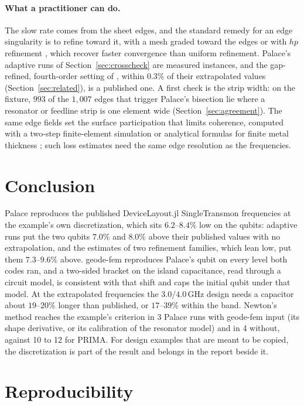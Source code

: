 \documentclass{anvil-paper}
\begin{document}
\paragraph{What a practitioner can do.}
The slow rate comes from the sheet edges, and the standard remedy for an
edge singularity is to refine toward it, with a mesh graded toward the
edges or with $hp$ refinement \citep{demkowicz2006computing}, which recover
faster convergence than uniform refinement. Palace's adaptive runs of
Section~\ref{sec:crosscheck} are measured instances, and the gap-refined,
fourth-order setting of \citet{ye2025electromagnetic}, within $0.3\%$ of
their extrapolated values (Section~\ref{sec:related}), is a published one.
A first check is the strip width: on the fixture, $993$ of the $1{,}007$
edges that trigger Palace's bisection lie where a resonator or feedline
strip is one element wide (Section~\ref{sec:agreement}). The same edge fields set the surface participation
that limits coherence, computed with a two-step finite-element simulation
\citep{wang2015surface} or analytical formulas for finite metal thickness
\citep{martinis2022surface}; such loss estimates need the same edge
resolution as the frequencies.

\section{Conclusion}
\label{sec:conclusion}

Palace reproduces the published DeviceLayout.jl SingleTransmon
frequencies at the example's own discretization, which sits $6.2$--$8.4\%$
low on the qubits: adaptive runs put the two qubits $7.0\%$ and $8.0\%$
above their published values with no extrapolation, and the estimates of
two refinement families, which lean low, put them $7.3$--$9.6\%$ above. geode-fem
reproduces Palace's qubit on every level both codes ran, and a two-sided
bracket on the island capacitance, read through a circuit model, is
consistent with that shift and caps the initial qubit under that model. At
the extrapolated frequencies the $3.0$/$4.0$\,GHz design needs a capacitor
about $19$--$20\%$ longer than published, or $17$--$39\%$ within the band.
Newton's method reaches the
example's criterion in 3 Palace runs with geode-fem input (its shape
derivative, or its calibration of the resonator model) and in 4 without,
against 10 to 12 for PRIMA. For design examples that are meant to be
copied, the discretization is part of the result and belongs in the report
beside it.

\section{Reproducibility}
\label{sec:repro}
\end{document}
